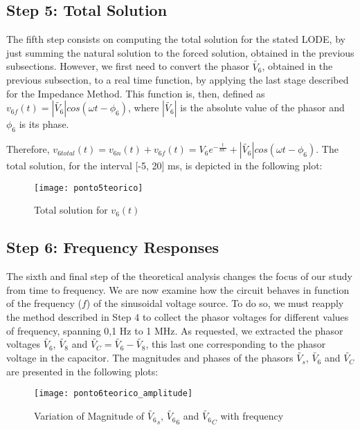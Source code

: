 \subsection{Step 5: Total Solution}

The fifth step consists on computing the total solution for the stated LODE, by just summing the natural solution to the forced solution, obtained in the previous subsections. However, we first need to convert the phasor $\tilde{V_6}$, obtained in the previous subsection, to a real time function, by applying the last stage described for the Impedance Method. This function is, then, defined as $v_{6f}(t) = |\tilde{V_6}|cos(\omega t - \phi_6)$, where $|\tilde{V_6}|$ is the absolute value of the phasor and $\phi_6$ is its phase.

Therefore, $v_{6 total}(t) = v_{6n}(t) + v_{6f}(t) = V_6e^{-\frac{t}{RC}} + |\tilde{V_6}|cos(\omega t - \phi_6)$. The total solution, for the interval [-5, 20] ms, is depicted in the following plot:

\FloatBarrier
\begin{figure}[h] \centering
	\texttt{[image: ponto5teorico]}
	\caption{Total solution for $v_6(t)$}
	\label{fig:ponto5teorico}
\end{figure}
\FloatBarrier

\subsection{Step 6: Frequency Responses}
\label{sec:step6}
The sixth and final step of the theoretical analysis changes the focus of our study from time to frequency. We are now examine how the circuit behaves in function of the frequency ($f$) of the sinusoidal voltage source. To do so, we must reapply the method described in Step 4 to collect the phasor voltages for different values of frequency, spanning 0,1 Hz to 1 MHz. As requested, we extracted the phasor voltages $\tilde{V_6}$, $\tilde{V_8}$ and $\tilde{V_C} = \tilde{V_6} - \tilde{V_8}$, this last one corresponding to the phasor voltage in the capacitor. The magnitudes and phases of the phasors $\tilde{V_s}$, $\tilde{V_6}$ and $\tilde{V_C}$ are presented in the following plots:

\FloatBarrier
\begin{figure}[h] \centering
	\texttt{[image: ponto6teorico\_amplitude]}
	\caption{Variation of Magnitude of $\tilde{V_6}_s$, $\tilde{V_6}_6$ and $\tilde{V_6}_C$ with frequency}
	\label{fig:magnitude}
\end{figure}  
\FloatBarrier

